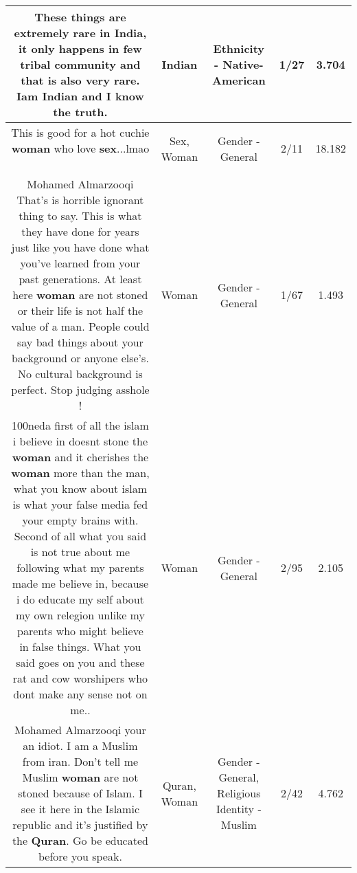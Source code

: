 \documentclass[11pt]{article}
\newlength\mylength
\begin{document}
\begin{center}
\begin{longtable}{|C{.65\mylength}|C{.30\mylength}|C{.12\mylength}|C{.12\mylength}|C{.12\mylength}|}
  \small These things are extremely rare in India, it only happens in few tribal community and that is also very rare. Iam \textbf{Indian} and I know the truth.\normalsize   & Indian & Ethnicity - Native-American & 1/27 & 3.704 \\  \hline
  \small This is good for a hot cuchie \textbf{woman} who love \textbf{sex}...lmao🤣🤣🤣\normalsize   & Sex, Woman & Gender - General & 2/11 & 18.182 \\  \hline
  \small Mohamed Almarzooqi That's is horrible ignorant thing to say. This is what they have done for years just like you have done what you've learned from your past generations. At least here \textbf{woman} are not stoned or their life is not half the value of a man. People could say bad things about your background or anyone else's. No cultural background is perfect. Stop judging asshole !\normalsize   & Woman & Gender - General & 1/67 & 1.493 \\  \hline
  \small \@100neda first of all the islam i believe in doesnt stone the \textbf{woman} and it cherishes the \textbf{woman} more than the man, what you know about islam is what your false media fed your empty brains with. Second of all what you said is not true about me following what my parents made me believe in, because i do educate my self about my own relegion unlike my parents who might believe in false things. What you said goes on you and these rat and cow worshipers who dont make any sense not on me..\normalsize   & Woman & Gender - General & 2/95 & 2.105 \\  \hline
  \small Mohamed Almarzooqi your an idiot. I am a Muslim from iran. Don't tell me Muslim \textbf{woman} are not stoned because of Islam. I see it here in the Islamic republic and it's justified by the \textbf{Quran}. Go be educated before you speak.\normalsize   & Quran, Woman & Gender - General, Religious Identity - Muslim & 2/42 & 4.762 \\  \hline

\end{longtable}
\end{center}
\end{document}

